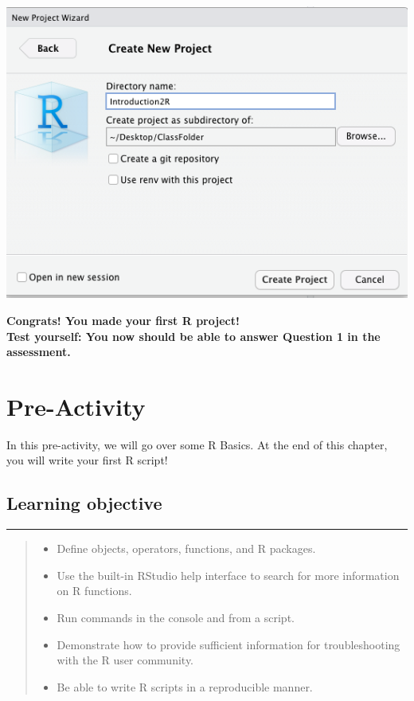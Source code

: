 \documentclass[
]{book}
\providecommand{\tightlist}{%
  \setlength{\itemsep}{0pt}\setlength{\parskip}{0pt}}
\begin{document}
\begin{center}\includegraphics[width=0.7\linewidth]{img/Project4} \end{center}

\textbf{Congrats! You made your first R project!}\\
\textbf{Test yourself: You now should be able to answer Question 1 in the assessment.}

\hypertarget{pre-activity}{%
\chapter{Pre-Activity}\label{pre-activity}}

In this pre-activity, we will go over some R Basics. At the end of this chapter, you will write your first R script!

\hypertarget{learning-objective-1}{%
\section{Learning objective}\label{learning-objective-1}}

\begin{center}\rule{0.5\linewidth}{0.5pt}\end{center}

\begin{quote}
\begin{itemize}
\tightlist
\item
  Define objects, operators, functions, and R packages.
\item
  Use the built-in RStudio help interface to search for more information on R functions.
\item
  Run commands in the console and from a script.
\item
  Demonstrate how to provide sufficient information for troubleshooting with the R user community.
\item
  Be able to write R scripts in a reproducible manner.
\end{itemize}
\end{quote}
\end{document}
